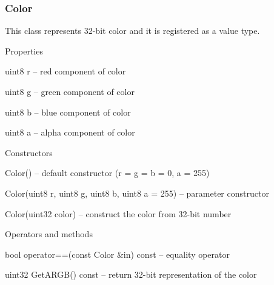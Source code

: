 \documentclass[12pt, a4paper]{article}
\newenvironment{titled-itemize}[1]
{
\vspace{5mm}
\noindent\textbf{#1}
\begin{itemize}
}
{
\end{itemize}
}
\begin{document}
\subsubsection{Color}

This class represents 32-bit color and it is registered as a value type.

\begin{titled-itemize}{Properties}
  \item uint8 r -- red component of color
  \item uint8 g -- green component of color
  \item uint8 b -- blue component of color
  \item uint8 a -- alpha component of color
\end{titled-itemize}

\begin{titled-itemize}{Constructors}
  \item Color() -- default constructor (r = g = b = 0, a = 255)
  \item Color(uint8 r, uint8 g, uint8 b, uint8 a = 255) -- parameter constructor
  \item Color(uint32 color) -- construct the color from 32-bit number
\end{titled-itemize}

\begin{titled-itemize}{Operators and methods}
  \item bool operator==(const Color \&in) const -- equality operator
  \item uint32 GetARGB() const -- return 32-bit representation of the color
\end{titled-itemize}
\end{document}
